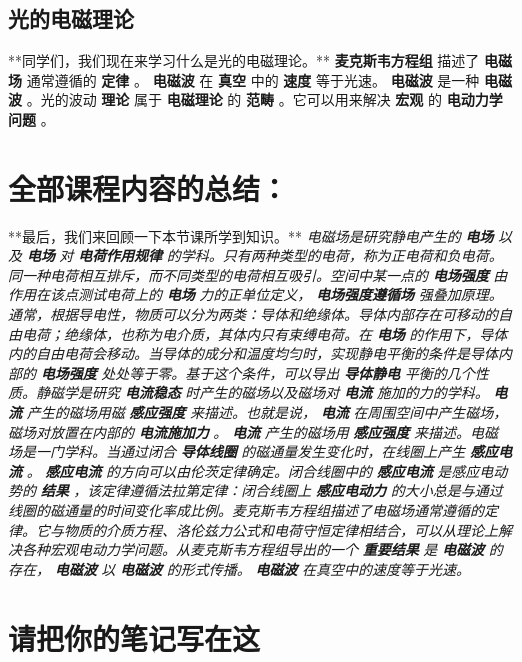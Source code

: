 \documentclass{article}%
\begin{document}
\begin{minipage}{0.95\textwidth}
%
\subsection{光的电磁理论}%
\label{subsec:}%
**同学们，我们现在来学习什么是光的电磁理论。**\newline%
%
%
\textbf{麦克斯韦方程组}%
描述了%
\textbf{电磁场}%
通常遵循的%
\textbf{定律}%
。%
\textbf{电磁波}%
在%
\textbf{真空}%
中的%
\textbf{速度}%
等于光速。%
\textbf{电磁波}%
是一种%
\textbf{电磁波}%
。光的波动%
\textbf{理论}%
属于%
\textbf{电磁理论}%
的%
\textbf{范畴}%
。它可以用来解决%
\textbf{宏观}%
的%
\textbf{电动力学问题}%
。

%
\end{minipage}%
\section{全部课程内容的总结：}%
\label{sec:}%
**最后，我们来回顾一下本节课所学到知识。**\newline%
%
\textit{电磁场是研究静电产生的}%
\textbf{\textit{电场}}%
\textit{以及}%
\textbf{\textit{电场}}%
\textit{对}%
\textbf{\textit{电荷作用规律}}%
\textit{的学科。只有两种类型的电荷，称为正电荷和负电荷。同一种电荷相互排斥，而不同类型的电荷相互吸引。空间中某一点的}%
\textbf{\textit{电场强度}}%
\textit{由作用在该点测试电荷上的}%
\textbf{\textit{电场}}%
\textit{力的正单位定义，}%
\textbf{\textit{电场强度遵循场}}%
\textit{强叠加原理。通常，根据导电性，物质可以分为两类：导体和绝缘体。导体内部存在可移动的自由电荷；绝缘体，也称为电介质，其体内只有束缚电荷。在}%
\textbf{\textit{电场}}%
\textit{的作用下，导体内的自由电荷会移动。当导体的成分和温度均匀时，实现静电平衡的条件是导体内部的}%
\textbf{\textit{电场强度}}%
\textit{处处等于零。基于这个条件，可以导出}%
\textbf{\textit{导体静电}}%
\textit{平衡的几个性质。静磁学是研究}%
\textbf{\textit{电流稳态}}%
\textit{时产生的磁场以及磁场对}%
\textbf{\textit{电流}}%
\textit{施加的力的学科。}%
\textbf{\textit{电流}}%
\textit{产生的磁场用磁}%
\textbf{\textit{感应强度}}%
\textit{来描述。也就是说，}%
\textbf{\textit{电流}}%
\textit{在周围空间中产生磁场，磁场对放置在内部的}%
\textbf{\textit{电流施加力}}%
\textit{。}%
\textbf{\textit{电流}}%
\textit{产生的磁场用}%
\textbf{\textit{感应强度}}%
\textit{来描述。电磁场是一门学科。当通过闭合}%
\textbf{\textit{导体线圈}}%
\textit{的磁通量发生变化时，在线圈上产生}%
\textbf{\textit{感应电流}}%
\textit{。}%
\textbf{\textit{感应电流}}%
\textit{的方向可以由伦茨定律确定。闭合线圈中的}%
\textbf{\textit{感应电流}}%
\textit{是感应电动势的}%
\textbf{\textit{结果}}%
\textit{，该定律遵循法拉第定律：闭合线圈上}%
\textbf{\textit{感应电动力}}%
\textit{的大小总是与通过线圈的磁通量的时间变化率成比例。麦克斯韦方程组描述了电磁场通常遵循的定律。它与物质的介质方程、洛伦兹力公式和电荷守恒定律相结合，可以从理论上解决各种宏观电动力学问题。从麦克斯韦方程组导出的一个}%
\textbf{\textit{重要结果}}%
\textit{是}%
\textbf{\textit{电磁波}}%
\textit{的存在，}%
\textbf{\textit{电磁波}}%
\textit{以}%
\textbf{\textit{电磁波}}%
\textit{的形式传播。}%
\textbf{\textit{电磁波}}%
\textit{在真空中的速度等于光速。}

%
\section{请把你的笔记写在这}%
\label{sec:}%

%
\end{document}
